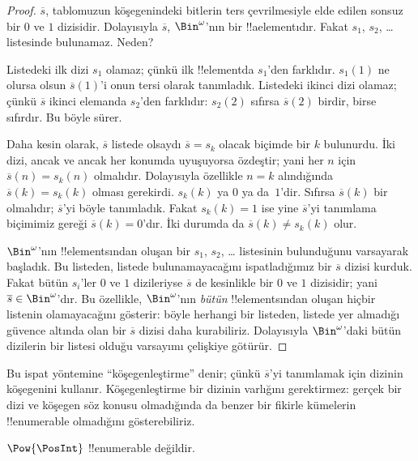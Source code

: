 \documentclass[../../../include/open-logic-section]{subfiles}
\begin{document}
\begin{proof}
$\overline{s}$, tablomuzun köşegenindeki bitlerin ters çevrilmesiyle elde
edilen sonsuz bir $0$ ve $1$ dizisidir. Dolayısıyla $\overline{s}$,
$\Bin^\omega$'nın bir !!a{element}{}ıdır. Fakat $s_1$,
$s_2$, \dots{} listesinde bulunamaz. Neden?

Listedeki ilk dizi $s_1$ olamaz; çünkü ilk !!{element}{}da $s_1$'den farklıdır.
$s_1(1)$ ne olursa olsun $\overline{s}(1)$'i onun tersi olarak tanımladık.
Listedeki ikinci dizi olamaz; çünkü $\overline{s}$ ikinci elemanda $s_2$'den
farklıdır: $s_2(2)$ sıfırsa $\overline{s}(2)$ birdir, birse sıfırdır. Bu
böyle sürer.

Daha kesin olarak, $\overline{s}$ listede olsaydı $\overline{s}=s_k$ olacak
biçimde bir $k$ bulunurdu. İki dizi, ancak ve ancak her konumda uyuşuyorsa
özdeştir; yani her $n$ için $\overline{s}(n)=s_k(n)$ olmalıdır. Dolayısıyla
özellikle $n=k$ alındığında $\overline{s}(k)=s_k(k)$ olması gerekirdi.
$s_k(k)$ ya $0$ ya da~$1$'dir. Sıfırsa $\overline{s}(k)$ bir olmalıdır;
$\overline{s}$'yi böyle tanımladık. Fakat $s_k(k)=1$ ise yine
$\overline{s}$'yi tanımlama biçimimiz gereği $\overline{s}(k)=0$'dır. İki
durumda da $\overline{s}(k)\neq s_k(k)$ olur.

$\Bin^\omega$'nın !!{element}s{}ından oluşan bir $s_1$, $s_2$, \dots{}
listesinin bulunduğunu varsayarak başladık. Bu listeden, listede
bulunamayacağını ispatladığımız bir $\overline{s}$ dizisi kurduk. Fakat bütün
$s_i$'ler $0$ ve $1$ dizileriyse $\overline{s}$ de kesinlikle bir $0$ ve
$1$ dizisidir; yani $\overline{s}\in\Bin^\omega$'dır. Bu özellikle,
$\Bin^\omega$'nın \emph{bütün} !!{element}s{}ından oluşan hiçbir listenin
olamayacağını gösterir: böyle herhangi bir listeden, listede yer almadığı
güvence altında olan bir $\overline{s}$ dizisi daha kurabiliriz. Dolayısıyla
$\Bin^\omega$'daki bütün dizilerin bir listesi olduğu varsayımı çelişkiye
götürür.
\end{proof}

\begin{explain}
Bu ispat yöntemine ``köşegenleştirme'' denir; çünkü $\overline{s}$'yi
tanımlamak için dizinin köşegenini kullanır. Köşegenleştirme bir dizinin
varlığını gerektirmez: gerçek bir dizi ve köşegen söz konusu olmadığında da
benzer bir fikirle kümelerin !!{enumerable} olmadığını gösterebiliriz.
\end{explain}

\begin{thm}
$\Pow{\PosInt}$ !!{enumerable} değildir.
\end{thm}
\end{document}
